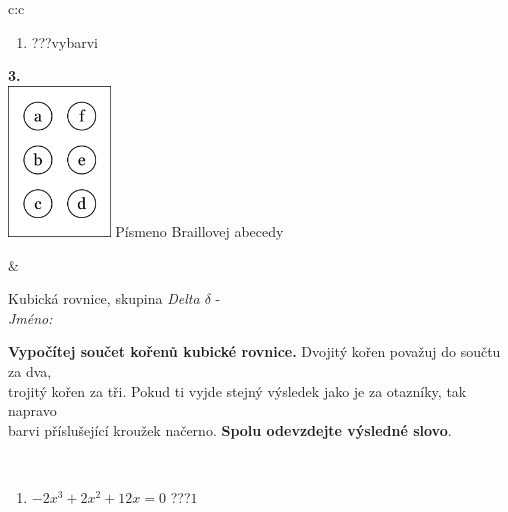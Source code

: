 \documentclass[10pt]{report}
\begin{document}
\begin{tabular}{c:c}
\begin{minipage}[c][104.5mm][t]{0.5\linewidth}
\begin{center}
\begin{minipage}{0.79\linewidth}
\begin{center}
\begin{varwidth}{\linewidth}
\begin{enumerate}
\item \quad \dotfill\; ???\;\dotfill \quad vybarvi
\end{enumerate}
\end{varwidth}
\end{center}
\end{minipage}
\begin{minipage}{0.20\linewidth}
\begin{center}
{\Huge\bfseries 3.} \\[2mm]
\includegraphics[height=40mm]{../images/braille.png}
{\small Písmeno Braillovej abecedy}
\end{center}
\end{minipage}
\end{center}
\end{minipage}
&
\begin{minipage}[c][104.5mm][t]{0.5\linewidth}
\begin{center}
\vspace{7mm}
{\huge Kubická rovnice, skupina \textit{Delta $\delta$} -}\\[5mm]
\textit{Jméno:}\phantom{xxxxxxxxxxxxxxxxxxxxxxxxxxxxxxxxxxxxxxxxxxxxxxxxxxxxxxxxxxxxxxxxx}\\[5mm]
\begin{minipage}{0.95\linewidth}
\begin{center}
\textbf{Vypočítej součet kořenů kubické rovnice.} Dvojitý kořen považuj do součtu za dva,\\trojitý kořen za tři. Pokud ti vyjde stejný výsledek jako je za otazníky, tak napravo\\barvi příslušející kroužek načerno. \textbf{Spolu odevzdejte výsledné slovo}.
\end{center}
\end{minipage}
\\[1mm]
\begin{minipage}{0.79\linewidth}
\begin{center}
\begin{varwidth}{\linewidth}
\begin{enumerate}
\Large
\item $-2x^3+2x^2+12x=0$\quad \dotfill\; ???\;\dotfill \quad $1$

\end{enumerate}
\end{varwidth}
\end{center}
\end{minipage}
\end{center}
\end{minipage}
\end{tabular}
\end{document}
